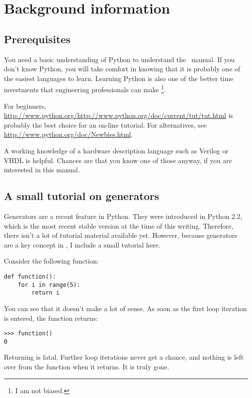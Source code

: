 \chapter{Background information}

\section{Prerequisites}

You need a basic understanding of Python to understand the \myhdl\
manual. If you don't know Python, you will take comfort in knowing
that it is probably one of the easiest languages to learn. Learning
Python is also one of the better time investments that engineering
professionals can make \footnote{I am not biased.}.

For beginners,
\url{http://www.python.org/http://www.python.org/doc/current/tut/tut.html}
is probably the best choice for an on-line tutorial. For alternatives,
see \url{http://www.python.org/doc/Newbies.html}.

A working knowledge of a hardware description language such as Verilog
or VHDL is helpful. Chances are that you know one of those anyway, if
you are interested in this manual.

\section{A small tutorial on generators}

Generators are a recent feature in Python. They were introduced in
Python 2.2, which is the most recent stable version at the time of
this writing. Therefore, there isn't a lot of tutorial material
available yet. However, because generators are a key concept in
\myhdl{}, I include a small tutorial here.

Consider the following function:

\begin{verbatim}
def function():
    for i in range(5):
        return i

\end{verbatim}

You can see that it doesn't make a lot of sense. As soon as the first
loop iteration is entered, the function returns:

\begin{verbatim}
>>> function()
0
\end{verbatim}

Returning is fatal. Further loop iterations never get a chance, and
nothing is left over from the function when it returns. It is truly
gone. 

